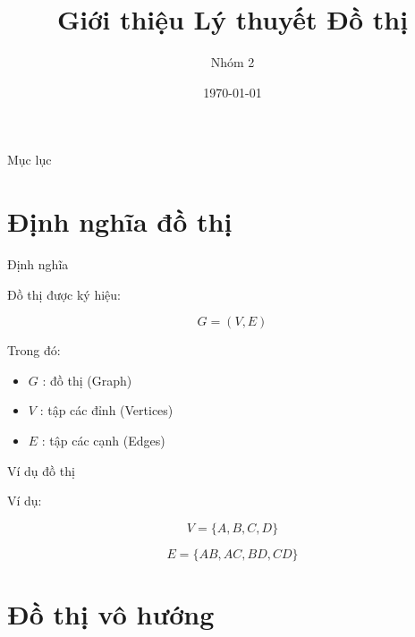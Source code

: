 \documentclass{beamer}
\title{Giới thiệu Lý thuyết Đồ thị}
\author{Nhóm 2}
\date{\today}
\begin{document}
\frame{\titlepage}

\begin{frame}{Mục lục}
\tableofcontents
\end{frame}

\section{Định nghĩa đồ thị}

\begin{frame}{Định nghĩa}

Đồ thị được ký hiệu:

\[
G = (V,E)
\]

Trong đó:

\begin{itemize}
\item $G$ : đồ thị (Graph)
\item $V$ : tập các đỉnh (Vertices)
\item $E$ : tập các cạnh (Edges)
\end{itemize}

\end{frame}

\begin{frame}{Ví dụ đồ thị}

\begin{center}


\end{center}

Ví dụ:

\[
V=\{A,B,C,D\}
\]

\[
E=\{AB,AC,BD,CD\}
\]

\end{frame}

\section{Đồ thị vô hướng}
\end{document}
